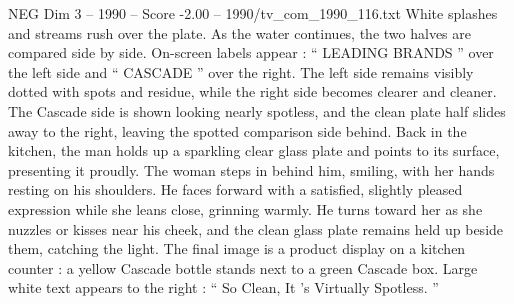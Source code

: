\begin{textsample}{NEG Dim 3 – 1990 – Score -2.00 – 1990/tv\_com\_1990\_116.txt}
White splashes and streams rush over the plate.
As the water continues, the two halves are compared side by side.
On-screen labels appear : “ LEADING BRANDS ” over the left side and “ CASCADE ” over the right.
The left side remains visibly dotted with spots and residue, while the right side becomes clearer and cleaner.
The Cascade side is shown looking nearly spotless, and the clean plate half slides away to the right, leaving the spotted comparison side behind.
Back in the kitchen, the man holds up a sparkling clear glass plate and points to its surface, presenting it proudly.
The woman steps in behind him, smiling, with her hands resting on his shoulders.
He faces forward with a satisfied, slightly pleased expression while she leans close, grinning warmly.
He turns toward her as she nuzzles or kisses near his cheek, and the clean glass plate remains held up beside them, catching the light.
The final image is a product display on a kitchen counter : a yellow Cascade bottle stands next to a green Cascade box.
Large white text appears to the right : “ So Clean, It ’s Virtually Spotless. ”

\end{textsample}
